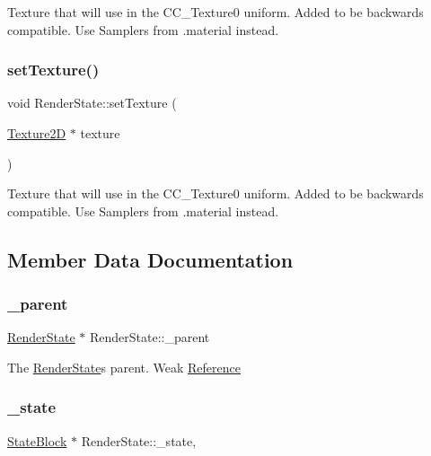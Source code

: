 Texture that will use in the C\+C\+\_\+\+Texture0 uniform. Added to be backwards compatible. Use Samplers from .material instead. \mbox{\label{classRenderState_ae41fdde5c9e67eb4e5967c8de711cda6}} 
\subsubsection{\texorpdfstring{set\+Texture()}{setTexture()}\hspace{0.1cm}{\footnotesize\ttfamily [2/2]}}
{\footnotesize\ttfamily void Render\+State\+::set\+Texture (\begin{DoxyParamCaption}\item[{\hyperlink{classTexture2D}{Texture2D} $\ast$}]{texture }\end{DoxyParamCaption})}

Texture that will use in the C\+C\+\_\+\+Texture0 uniform. Added to be backwards compatible. Use Samplers from .material instead. 

\subsection{Member Data Documentation}
\mbox{\label{classRenderState_a33a724fc34b35f6934717e1837ec918d}} 
\subsubsection{\texorpdfstring{\+\_\+parent}{\_parent}}
{\footnotesize\ttfamily \hyperlink{classRenderState}{Render\+State} $\ast$ Render\+State\+::\+\_\+parent\hspace{0.3cm}{\ttfamily [protected]}}

The \hyperlink{classRenderState}{Render\+State}\textquotesingle{}s parent. Weak \hyperlink{structReference}{Reference} \mbox{\label{classRenderState_ac40064c8b7e06604366149b9d772e2d5}} 
\subsubsection{\texorpdfstring{\+\_\+state}{\_state}}
{\footnotesize\ttfamily \hyperlink{classRenderState_1_1StateBlock}{State\+Block} $\ast$ Render\+State\+::\+\_\+state\hspace{0.3cm}{\ttfamily [mutable]}, {\ttfamily [protected]}}

